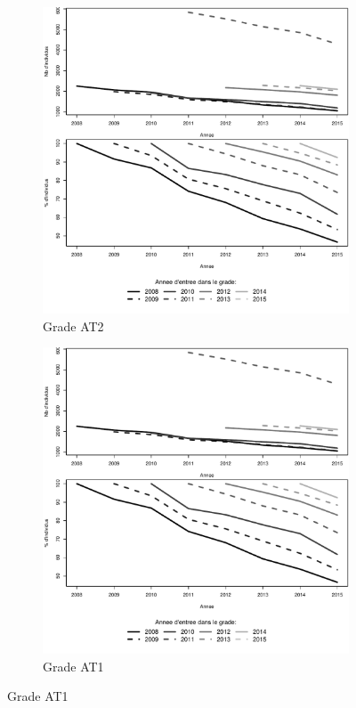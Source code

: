 \documentclass[11pt,a4paper]{article}
\begin{document}
\begin{figure}[ht] 
  \caption{Survie dans le grade: Adjoints techniques}
  \label{echelon_by_neg} 
  \begin{subfigure}[b]{0.55\linewidth}
      \caption{Grade AT2} 
    \label{echelon_by_neg_0} 
    \centering
    \includegraphics[width=1\linewidth]{survival_AT_1.pdf} 
    \vspace{4ex}
  \end{subfigure}
  \begin{subfigure}[b]{0.55\linewidth}
        \caption{Grade AT1} 
    \label{echelon_by_neg_1} 
    \centering
    \includegraphics[width=1\linewidth]{survival_AT_2.pdf} 
    \vspace{4ex}
  \end{subfigure} 
\end{figure}
\end{document}
